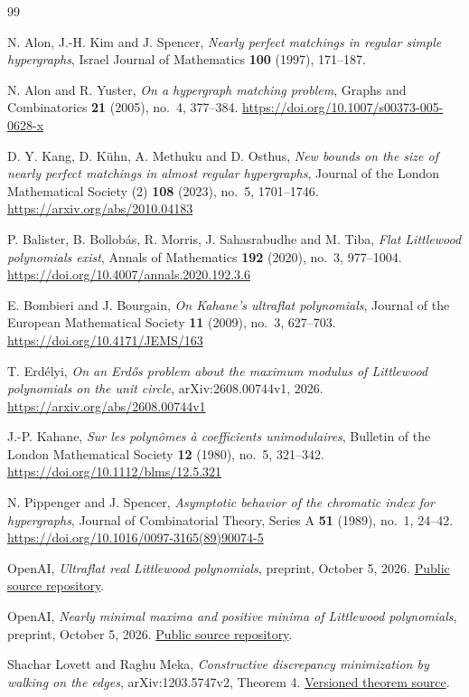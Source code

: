 \documentclass[11pt]{article}
\theoremstyle{remark}
\begin{document}
\begin{thebibliography}{99}

N. Alon, J.-H. Kim and J. Spencer, \emph{Nearly perfect matchings in
regular simple hypergraphs}, Israel Journal of Mathematics \textbf{100}
(1997), 171--187.

N. Alon and R. Yuster, \emph{On a hypergraph matching problem}, Graphs and
Combinatorics \textbf{21} (2005), no.~4, 377--384.
\url{https://doi.org/10.1007/s00373-005-0628-x}

D. Y. Kang, D. K\"uhn, A. Methuku and D. Osthus, \emph{New bounds on the
size of nearly perfect matchings in almost regular hypergraphs}, Journal of
the London Mathematical Society (2) \textbf{108} (2023), no.~5, 1701--1746.
\url{https://arxiv.org/abs/2010.04183}

P. Balister, B. Bollob\'as, R. Morris, J. Sahasrabudhe and M. Tiba,
\emph{Flat Littlewood polynomials exist}, Annals of Mathematics
\textbf{192} (2020), no.~3, 977--1004.
\url{https://doi.org/10.4007/annals.2020.192.3.6}

E. Bombieri and J. Bourgain, \emph{On Kahane's ultraflat polynomials},
Journal of the European Mathematical Society \textbf{11} (2009), no.~3,
627--703. \url{https://doi.org/10.4171/JEMS/163}

T. Erd\'elyi, \emph{On an Erd\H{o}s problem about the maximum modulus of
Littlewood polynomials on the unit circle}, arXiv:2608.00744v1, 2026.
\url{https://arxiv.org/abs/2608.00744v1}

J.-P. Kahane, \emph{Sur les polyn\^omes \`a coefficients unimodulaires},
Bulletin of the London Mathematical Society \textbf{12} (1980), no.~5,
321--342. \url{https://doi.org/10.1112/blms/12.5.321}

N. Pippenger and J. Spencer, \emph{Asymptotic behavior of the chromatic
index for hypergraphs}, Journal of Combinatorial Theory, Series A
\textbf{51} (1989), no.~1, 24--42.
\url{https://doi.org/10.1016/0097-3165(89)90074-5}

OpenAI, \emph{Ultraflat real Littlewood polynomials}, preprint,
October 5, 2026.
\href{https://github.com/openai/math/tree/main/preprints/Ultraflat-real-Littlewood-polynomials-October-5-2026}{Public source repository}.

OpenAI, \emph{Nearly minimal maxima and positive minima of Littlewood
polynomials}, preprint, October 5, 2026.
\href{https://github.com/openai/math/tree/main/preprints/Nearly-minimal-maxima-and-positive-minima-of-Littlewood-polynomials-October-5-2026}{Public source repository}.

Shachar Lovett and Raghu Meka, \emph{Constructive discrepancy minimization
by walking on the edges}, arXiv:1203.5747v2, Theorem 4.
\href{https://arxiv.org/pdf/1203.5747v2}{Versioned theorem source}.

\end{thebibliography}
\end{document}
